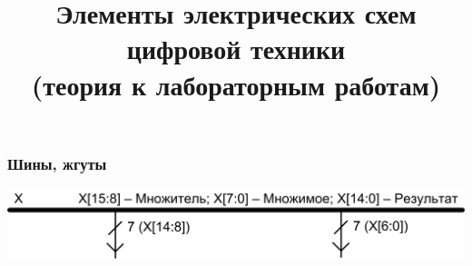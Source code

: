


\title[Элементы схем цифровой техники]{Элементы электрических схем цифровой техники\\(теория к лабораторным работам)}

\setcounter{TaskSimpleCtr}{1}
\newcommand{\TaskSimpleNumber}{ \arabic{TaskSimpleCtr}) \addtocounter{TaskSimpleCtr}{1} }





\begin{frame}
    \frametitle{Шины, жгуты}
    \begin{center}
        \includegraphics[width=.9\textwidth]{fig/bus}
    \end{center}
\end{frame}

